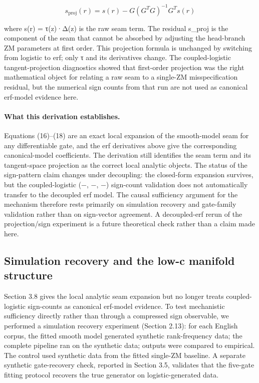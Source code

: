 \documentclass[11pt]{article}
\begin{document}
\begin{equation}
\tag{19}\label{eq:tangent}
s_{\mathrm{proj}}(r) = s(r) - G(G^T G)^{-1} G^T s(r)
\end{equation}

where s(r) = τ(z)·Δ(z) is the raw seam term. The residual s\_proj is the component of the seam that cannot be absorbed by adjusting the head-branch ZM parameters at first order. This projection formula is unchanged by switching from logistic to erf; only τ and its derivatives change. The coupled-logistic tangent-projection diagnostics showed that first-order projection was the right mathematical object for relating a raw seam to a single-ZM misspecification residual, but the numerical sign counts from that run are not used as canonical erf-model evidence here.

\paragraph{What this derivation establishes.} Equations (16)–(18) are an exact local expansion of the smooth-model seam for any differentiable gate, and the erf derivatives above give the corresponding canonical-model coefficients. The derivation still identifies the seam term and its tangent-space projection as the correct local analytic objects. The status of the sign-pattern claim changes under decoupling: the closed-form expansion survives, but the coupled-logistic (−, −, −) sign-count validation does not automatically transfer to the decoupled erf model. The causal sufficiency argument for the mechanism therefore rests primarily on simulation recovery and gate-family validation rather than on sign-vector agreement. A decoupled-erf rerun of the projection/sign experiment is a future theoretical check rather than a claim made here.

\subsection{Simulation recovery and the low-c manifold structure}\label{sec:3-9-manifold}

Section 3.8 gives the local analytic seam expansion but no longer treats coupled-logistic sign-counts as canonical erf-model evidence. To test mechanistic sufficiency directly rather than through a compressed sign observable, we performed a simulation recovery experiment (Section 2.13): for each English corpus, the fitted smooth model generated synthetic rank-frequency data; the complete pipeline ran on the synthetic data; outputs were compared to empirical. The control used synthetic data from the fitted single-ZM baseline. A separate synthetic gate-recovery check, reported in Section 3.5, validates that the five-gate fitting protocol recovers the true generator on logistic-generated data.
\end{document}
